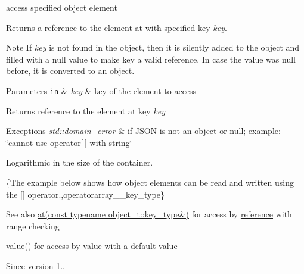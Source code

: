 access specified object element 

Returns a reference to the element at with specified key {\itshape key}.

\begin{DoxyNote}{Note}
If {\itshape key} is not found in the object, then it is silently added to the object and filled with a {\ttfamily null} value to make {\ttfamily key} a valid reference. In case the value was {\ttfamily null} before, it is converted to an object.
\end{DoxyNote}

\begin{DoxyParams}[1]{Parameters}
\mbox{\tt in}  & {\em key} & key of the element to access\\
\hline
\end{DoxyParams}
\begin{DoxyReturn}{Returns}
reference to the element at key {\itshape key} 
\end{DoxyReturn}

\begin{DoxyExceptions}{Exceptions}
{\em std\+::domain\+\_\+error} & if J\+S\+ON is not an object or null; example\+: {\ttfamily \char`\"{}cannot use operator\mbox{[}$\,$\mbox{]} with string\char`\"{}}\\
\hline
\end{DoxyExceptions}
Logarithmic in the size of the container.

\{The example below shows how object elements can be read and written using the {\ttfamily \mbox{[}\mbox{]}} operator.,operatorarray\+\_\+\+\_\+key\+\_\+type\}

\begin{DoxySeeAlso}{See also}
\hyperlink{classnlohmann_1_1basic__json_a7ed92d56cb313b243c1917696ffdf074}{at(const typename object\+\_\+t\+::key\+\_\+type\&)} for access by \hyperlink{classnlohmann_1_1basic__json_a3ec8e17be8732fe436e9d6733f52b7a3}{reference} with range checking 

\hyperlink{classnlohmann_1_1basic__json_a407e73a037e6e3067ef7aa2c25a79f39}{value()} for access by \hyperlink{classnlohmann_1_1basic__json_a407e73a037e6e3067ef7aa2c25a79f39}{value} with a default \hyperlink{classnlohmann_1_1basic__json_a407e73a037e6e3067ef7aa2c25a79f39}{value}
\end{DoxySeeAlso}
\begin{DoxySince}{Since}
version 1.. 
\end{DoxySince}
\hypertarget{classnlohmann_1_1basic__json_a6eb50ec247cc53bdd46fb13e38e0de04}{}\label{classnlohmann_1_1basic__json_a6eb50ec247cc53bdd46fb13e38e0de04} 

